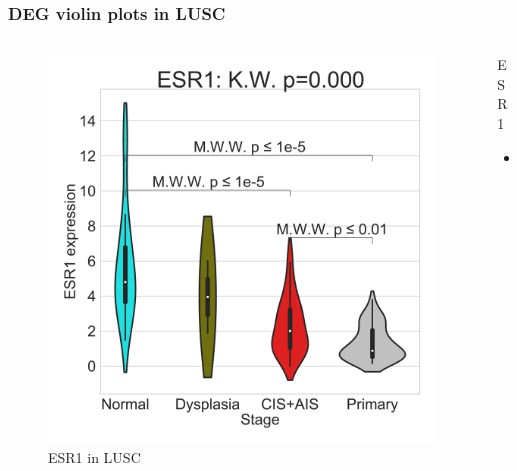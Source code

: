 \documentclass{beamer}
\begin{document}
                \begin{frame}[allowframebreaks]
                    \frametitle{DEG violin plots in LUSC}

                    \begin{columns}
                        \begin{column}{0.4 \textwidth}
                            \begin{figure}
                                \includegraphics[width=\linewidth]{figures/DEG/Violin/STAR.TPM.SQC.violin/ESR1.pdf}
                                \caption{ESR1 in LUSC}
                            \end{figure}
                        \end{column}
                        \begin{column}{0.55 \textwidth}
                            \begin{block}{ESR1}
                                \begin{itemize}
                                    \item
                                \end{itemize}
                            \end{block}
                        \end{column}
                    \end{columns}


\end{frame}
\end{document}
